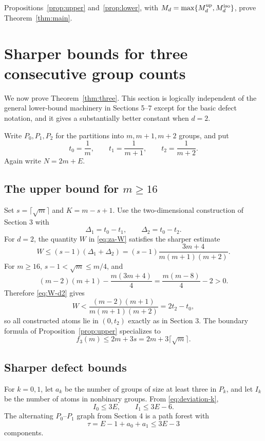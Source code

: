 \documentclass[11pt]{article}
\theoremstyle{definition}
\newcommand{\1}{\mathbf{1}}
\begin{document}
Propositions~\ref{prop:upper} and~\ref{prop:lower}, with $M_d=\max\{M_d^{\rm up},M_d^{\rm iso}\}$, prove Theorem~\ref{thm:main}.

\section{Sharper bounds for three consecutive group counts}

We now prove Theorem~\ref{thm:three}.  This section is logically independent of the general lower-bound machinery in Sections 5--7 except for the basic defect notation, and it gives a substantially better constant when $d=2$.

Write $P_0,P_1,P_2$ for the partitions into $m,m+1,m+2$ groups, and put
\[
  t_0=\frac1m,
  \qquad
  t_1=\frac1{m+1},
  \qquad
  t_2=\frac1{m+2}.
\]
Again write $N=2m+E$.

\subsection{The upper bound for $m\ge16$}

Set $s=\lceil\sqrt m\rceil$ and $K=m-s+1$.  Use the two-dimensional construction of Section 3 with
\[
  \Delta_1=t_0-t_1,
  \qquad
  \Delta_2=t_0-t_2.
\]
For $d=2$, the quantity $W$ in \eqref{eq:za-W} satisfies the sharper estimate
\begin{equation}\label{eq:W-d2}
  W\le(s-1)(\Delta_1+\Delta_2)
  =(s-1)\frac{3m+4}{m(m+1)(m+2)}.
\end{equation}
For $m\ge16$, $s-1<\sqrt m\le m/4$, and
\[
  (m-2)(m+1)-\frac{m(3m+4)}4
  =\frac{m(m-8)}4-2>0.
\]
Therefore \eqref{eq:W-d2} gives
\[
  W<\frac{(m-2)(m+1)}{m(m+1)(m+2)}
  =2t_2-t_0,
\]
so all constructed atoms lie in $(0,t_2)$ exactly as in Section 3.  The boundary formula of Proposition~\ref{prop:upper} specializes to
\[
  f_3(m)\le2m+3s=2m+3\lceil\sqrt m\rceil.
\]

\subsection{Sharper defect bounds}

For $k=0,1$, let $a_k$ be the number of groups of size at least three in $P_k$, and let $I_k$ be the number of atoms in nonbinary groups.  From \eqref{eq:deviation-k},
\begin{equation}\label{eq:d2-I01}
  I_0\le3E,
  \qquad
  I_1\le3E-6.
\end{equation}
The alternating $P_0$--$P_1$ graph from Section 4 is a path forest with
\begin{equation}\label{eq:d2-tau}
  \tau=E-1+a_0+a_1\le3E-3
\end{equation}
components.
\end{document}
